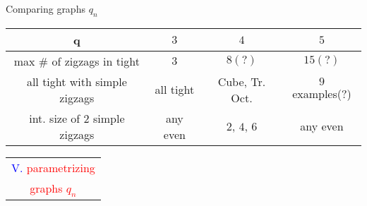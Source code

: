\documentclass[%
pdf,
colorBG,
slideColor,
]{prosper}
\begin{document}
\begin{slide}{Comparing graphs $q_n$}

\vspace{-4mm}
\begin{center}
{\scriptsize 
\begin{tabular}{|c||c|c|c|}
\hline
q                            &$3$        &$4$                &$5$\\
\hline
\hline
max \# of zigzags in tight   &$3$       &$8(?)$               &$15(?)$\\
\hline
all tight with simple zigzags   &all tight  &Cube, Tr. Oct.     &$9$ examples(?)\\
\hline
int. size of $2$ simple zigzags &any even   &$2$, $4$, $6$      &any even\\
\hline
\end{tabular}
}
\begin{center}
\end{center}

\end{center}


\end{slide}














\begin{slide}{}
\begin{center}
{\Huge 
\begin{tabular*}{7cm}{c}
\\[0.5cm]
\textcolor{blue}{V. }\textcolor{red}{parametrizing}\\
\textcolor{red}{graphs $q_n$}
\end{tabular*}
}
\end{center}
\end{slide}
\end{document}
